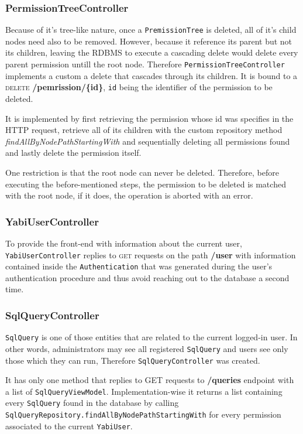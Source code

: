 \subsubsection{PermissionTreeController}
Because of it's tree-like nature, once a \texttt{PremissionTree} is deleted, all of it's child nodes need also to be removed. However, because it reference its parent but not its children, leaving the \gls{RDBMS} to execute a cascading delete would delete every parent permission untill the root node.
Therefore \texttt{PermissionTreeController} implements a custom a delete that cascades through its children. It is bound to a \textsc{delete} \textbf{/pemrission/\{id\}}, \texttt{id} being the identifier of the permission to be deleted.

It is implemented by first retrieving the permission whose id was specifies in the \gls{HTTP} request, retrieve all of its children with the custom repository method \textit{findAllByNodePathStartingWith} and sequentially deleting all permissions found and lastly delete the permission itself.

One restriction is that the root node can never be deleted. Therefore, before executing the before-mentioned steps, the permission to be deleted is matched with the root node, if it does, the operation is aborted with an error.

\subsubsection{YabiUserController}
To provide the front-end with information about the current user, \texttt{YabiUserController} replies to \textsc{get} requests on the path \textbf{/user} with information contained inside the \texttt{Authentication} that was generated during the user's authentication procedure and thus avoid reaching out to the database a second time.

\subsubsection{SqlQueryController}
\texttt{SqlQuery} is one of those entities that are related to the current logged-in user. In other words, administrators may see all registered \texttt{SqlQuery} and users see only those which they can run, Therefore \texttt{SqlQueryController} was created.

It has only one method that replies to \textsc{GET} requests to \textbf{/queries} endpoint with a list of \texttt{SqlQueryViewModel}. Implementation-wise it returns a list containing every \texttt{SqlQuery} found in the database by calling \texttt{SqlQueryRepository.findAllByNodePathStartingWith} for every permission associated to the current \texttt{YabiUser}.

